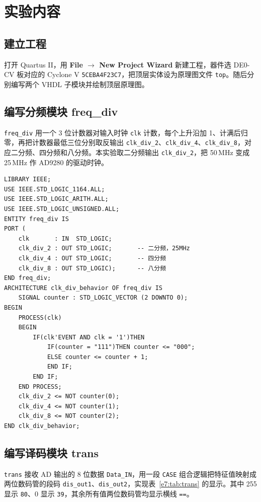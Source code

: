 \documentclass{ctexrep}
\begin{document}
\section{实验内容}

\subsection{建立工程}

打开 Quartus II，用 \textbf{File $\rightarrow$ New Project Wizard} 新建工程，器件选 DE0-CV 板对应的 Cyclone V \texttt{5CEBA4F23C7}，把顶层实体设为原理图文件 \texttt{top}。随后分别编写两个 VHDL 子模块并绘制顶层原理图。

\subsection{编写分频模块 freq\_div}

\texttt{freq\_div} 用一个 3 位计数器对输入时钟 \texttt{clk} 计数，每个上升沿加 1、计满后归零，再把计数器最低三位分别取反输出 \texttt{clk\_div\_2}、\texttt{clk\_div\_4}、\texttt{clk\_div\_8}，对应二分频、四分频和八分频。本实验取二分频输出 \texttt{clk\_div\_2}，把 50\,MHz 变成 25\,MHz 作 AD9280 的驱动时钟。

\begin{verbatim}
LIBRARY IEEE;
USE IEEE.STD_LOGIC_1164.ALL;
USE IEEE.STD_LOGIC_ARITH.ALL;
USE IEEE.STD_LOGIC_UNSIGNED.ALL;
ENTITY freq_div IS
PORT (
    clk       : IN  STD_LOGIC;
    clk_div_2 : OUT STD_LOGIC;       -- 二分频，25MHz
    clk_div_4 : OUT STD_LOGIC;       -- 四分频
    clk_div_8 : OUT STD_LOGIC);      -- 八分频
END freq_div;
ARCHITECTURE clk_div_behavior OF freq_div IS
    SIGNAL counter : STD_LOGIC_VECTOR (2 DOWNTO 0);
BEGIN
    PROCESS(clk)
    BEGIN
        IF(clk'EVENT AND clk = '1')THEN
            IF(counter = "111")THEN counter <= "000";
            ELSE counter <= counter + 1;
            END IF;
        END IF;
    END PROCESS;
    clk_div_2 <= NOT counter(0);
    clk_div_4 <= NOT counter(1);
    clk_div_8 <= NOT counter(2);
END clk_div_behavior;
\end{verbatim}
\label{e7:lst:freqdiv}

\subsection{编写译码模块 trans}

\texttt{trans} 接收 AD 输出的 8 位数据 \texttt{Data\_IN}，用一段 \texttt{CASE} 组合逻辑把特征值映射成两位数码管的段码 \texttt{dis\_out1}、\texttt{dis\_out2}，实现表~\ref{e7:tab:trans} 的显示。其中 255 显示 \texttt{80}、0 显示 \texttt{39}，其余所有值两位数码管均显示横线 \texttt{==}。
\end{document}

